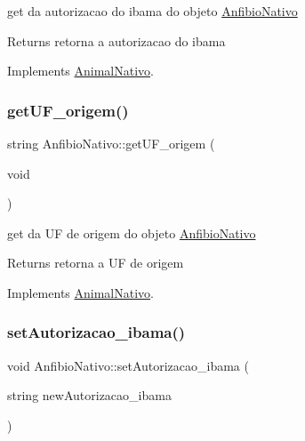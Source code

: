 get da autorizacao do ibama do objeto \mbox{\hyperlink{class_anfibio_nativo}{Anfibio\+Nativo}} 

\begin{DoxyReturn}{Returns}
retorna a autorizacao do ibama 
\end{DoxyReturn}


Implements \mbox{\hyperlink{class_animal_nativo}{Animal\+Nativo}}.

\mbox{\label{class_anfibio_nativo_a8bb0d0aad8d6a61a1accb9519cfbe10e}} 
\subsubsection{\texorpdfstring{getUF\_origem()}{getUF\_origem()}}
{\footnotesize\ttfamily string Anfibio\+Nativo\+::get\+U\+F\+\_\+origem (\begin{DoxyParamCaption}\item[{void}]{ }\end{DoxyParamCaption})\hspace{0.3cm}{\ttfamily [virtual]}}



get da UF de origem do objeto \mbox{\hyperlink{class_anfibio_nativo}{Anfibio\+Nativo}} 

\begin{DoxyReturn}{Returns}
retorna a UF de origem 
\end{DoxyReturn}


Implements \mbox{\hyperlink{class_animal_nativo}{Animal\+Nativo}}.

\mbox{\label{class_anfibio_nativo_a815f2903d6831bf07b5571724322b3b2}} 
\subsubsection{\texorpdfstring{setAutorizacao\_ibama()}{setAutorizacao\_ibama()}}
{\footnotesize\ttfamily void Anfibio\+Nativo\+::set\+Autorizacao\+\_\+ibama (\begin{DoxyParamCaption}\item[{string}]{new\+Autorizacao\+\_\+ibama }\end{DoxyParamCaption})\hspace{0.3cm}{\ttfamily [virtual]}}



